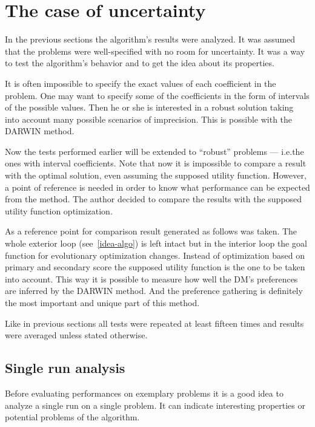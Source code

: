 \section{The case of uncertainty}
In the previous sections the algorithm's results were analyzed. It was assumed
that the problems were well-specified with no room for uncertainty. It was a
way to test the algorithm's behavior and to get the idea about its properties.

It is often impossible to specify the exact values of each coefficient in the
problem. One may want to specify some of the coefficients in the form of
intervals of the possible values. Then he or she is interested in a robust
solution taking into account many possible scenarios of imprecision. This is
possible with the DARWIN method.

Now the tests performed earlier will be extended to ``robust'' problems ---
i.e.the ones with interval coefficients. Note that now it is impossible to
compare a result with the optimal solution, even assuming the supposed utility
function. However, a point of reference is needed in order to know what
performance can be expected from the method. The author decided to compare the
results with the supposed utility function optimization.

As a reference point for comparison result generated as follows was taken. The
whole exterior loop (see~\ref{idea-algo}) is left intact but in the interior loop the
goal function for evolutionary optimization changes. Instead of optimization
based on primary and secondary score the supposed utility function is the one
to be taken into account. This way it is possible to measure how well the DM's
preferences are inferred by the DARWIN method. And the preference gathering is
definitely the most important and unique part of this method.

Like in previous sections all tests were repeated at least fifteen times and
results were averaged unless stated otherwise.

\subsection{Single run analysis}
Before evaluating performances on exemplary problems it is a good idea to
analyze a single run on a single problem. It can indicate interesting
properties or potential problems of the algorithm.

